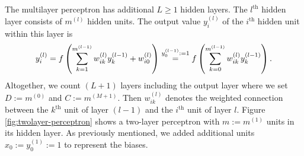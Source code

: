 The multilayer perceptron has additional $L \geq 1$ hidden layers. The $l^{\text{th}}$ hidden layer consists of $m^{(l)}$ hidden units. The output value $y_{i}^{(l)}$ of the $i^{\text{th}}$ hidden unit within this layer is
\begin{align}
y_{i}^{(l)} = f\left(\sum _{k =1} ^{m^{(l-1)}} w_{ik}^{(l)} y_{k}^{(l-1)} + w_{i0}^{(l)}\right) \overset{y_{0}^{(l-1)} := 1}{=} f\left(\sum _{k = 0} ^{m^{(l-1)}} w_{ik}^{(l)} y_{k}^{(l-1)}\right)\onedot
\end{align}
Altogether, we count $(L+1)$ layers including the output layer where we set $D := m^{(0)}$ and $C := m^{(M+1)}$. Then $w_{ik}^{(l)}$ denotes the weighted connection between the $k^{\text{th}}$ unit of layer $(l-1)$ and the $i^{\text{th}}$ unit of layer $l$. Figure \ref{fig:twolayer-perceptron} shows a two-layer perceptron with $m := m^{(1)}$ units in its hidden layer. As previously mentioned, we added additional units $x_0 := y_0^{(1)} := 1$ to represent the biases.

